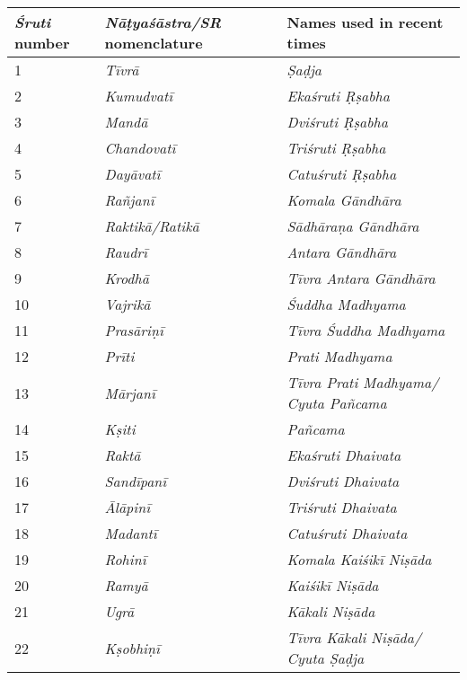 \begin{longtable}{|p{1.3cm}|p{3cm}|p{4cm}|}
\hline
\textbf{\textit{Śruti}\index{sruti@\textit{śruti}} number} & \textbf{\textit{Nāṭyaśāstra/SR}\index{Natyasastra@\textit{Nāṭya-śāstra}} nomenclature} & \textbf{Names used in recent times} \\
\hline
1 & \textit{Tīvrā} & \textit{Ṣaḍja} \\
\hline
2 & \textit{Kumudvatī} & \textit{Ekaśruti Ṛṣabha} \\
\hline
3 & \textit{Mandā} & \textit{Dviśruti Ṛṣabha} \\
\hline
4 & \textit{Chandovatī} & \textit{Triśruti Ṛṣabha} \\
\hline
5 & \textit{Dayāvatī} & \textit{Catuśruti Ṛṣabha} \\
\hline
6 & \textit{Rañjanī} & \textit{Komala Gāndhāra} \\
\hline
7 & \textit{Raktikā/Ratikā} & \textit{Sādhāraṇa Gāndhāra} \\
\hline
8 & \textit{Raudrī} & \textit{Antara Gāndhāra} \\
\hline
9 & \textit{Krodhā} & \textit{Tīvra Antara Gāndhāra} \\
\hline
10 & \textit{Vajrikā} & \textit{Śuddha Madhyama} \\
\hline
11 & \textit{Prasāriṇī} & \textit{Tīvra Śuddha Madhyama} \\
\hline
12 & \textit{Prīti} & \textit{Prati Madhyama} \\
\hline
13 & \textit{Mārjanī} & \textit{Tīvra Prati Madhyama/ Cyuta Pañcama} \\
\hline
14 & \textit{Kṣiti} & \textit{Pañcama} \\
\hline
15 & \textit{Raktā} & \textit{Ekaśruti Dhaivata} \\
\hline
16 & \textit{Sandīpanī} & \textit{Dviśruti Dhaivata} \\
\hline
17 & \textit{Ālāpinī} & \textit{Triśruti Dhaivata} \\
\hline
18 & \textit{Madantī} & \textit{Catuśruti Dhaivata} \\
\hline
19 & \textit{Rohinī} & \textit{Komala Kaiśikī Niṣāda} \\
\hline
20 & \textit{Ramyā} & \textit{Kaiśikī Niṣāda} \\
\hline
21 & \textit{Ugrā} & \textit{Kākali Niṣāda} \\
\hline
22 & \textit{Kṣobhiṇī} & \textit{Tīvra Kākali Niṣāda/ Cyuta Ṣaḍja} \\
\hline
\end{longtable}

